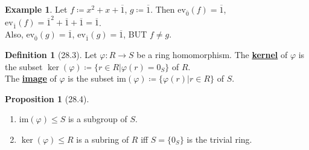 \documentclass{article}
\newcommand{\coleq}{\coloneqq}
\newcommand{\define}[1]{\textbf{\underline{#1}}}
\newcommand{\func}[3]{#1: #2 \to #3}
\theoremstyle{definition}
\newtheorem*{defn}{Definition}
\newtheorem*{prop}{Proposition}
\newtheorem*{ex}{Example}
\theoremstyle{remark}
\newcommand{\im}{\mathrm{im}}
\newcommand{\ev}{\mathrm{ev}}
\begin{document}
{{\begin{ex}
                \noindent Let $f\coleq x^2+x+\overline{1}$, $g\coleq \overline{1}$. Then $\ev_{\overline{0}}(f)=\overline{1}$, $\ev_{\overline{1}}(f)=\overline{1}^2+\overline{1}+\overline{1}=\overline{1}$.\\
                Also, $\ev_{\overline{0}}(g)=\overline{1}$, $\ev_{\overline{1}}(g)=\overline{1}$, BUT $f\neq g$.
            \end{ex}
            
            \begin{defn}[28.3]
                Let $\func{\varphi}{R}{S}$ be a ring homomorphism. The \define{kernel} of $\varphi$ is the subset $\ker(\varphi)\coleq\{r\in R|\varphi(r)=0_S\}$ of $R$.\\
                The \define{image} of $\varphi$ is the subset $\im(\varphi)\coleq\{\varphi(r)|r \in R\}$ of $S$.
            \end{defn}
            
            \begin{prop}[28.4]
                \begin{enumerate}
                    \item $\im(\varphi)\leq S$ is a subgroup of $S$.
                    \item $\ker(\varphi)\leq R$ is a subring of $R$ iff $S=\{0_S\}$ is the trivial ring.
                \end{enumerate}
            \end{prop}
            
        }
    }
    
\end{document}
